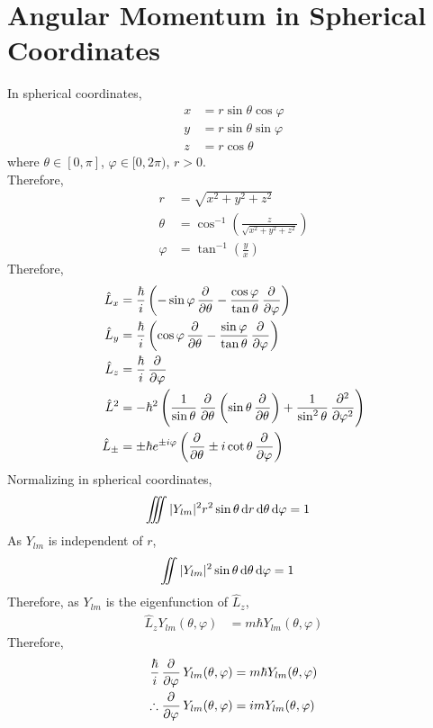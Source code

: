 \documentclass[titlepage, fleqn, a4paper, 12pt, twoside]{article}
\theoremstyle{definition}
\theoremstyle{theorem}
\let\Oldsection\section
\renewcommand{\section}{\FloatBarrier\Oldsection}
\begin{document}
\section{Angular Momentum in Spherical Coordinates}

In spherical coordinates,
\begin{align*}
	x &= r \sin \theta \cos \varphi\\
	y &= r \sin \theta \sin \varphi\\
	z &= r \cos \theta
\end{align*}
where $\theta \in [0,\pi]$, $\varphi \in [0,2 \pi)$, $r > 0$.\\
Therefore,
\begin{align*}
	r &= \sqrt{x^2 + y^2 + z^2}\\
	\theta &= \cos^{-1}\left( \frac{z}{\sqrt{x^2 + y^2 + z^2}} \right)\\
	\varphi &= \tan^{-1}\left( \frac{y}{x} \right)
\end{align*}
Therefore,
\begin{align*}
	\hat{L}_x &= \frac{\hbar}{i} \left( -\sin \varphi \dpd{}{\theta} - \frac{\cos \varphi}{\tan \theta} \dpd{}{\varphi} \right)\\
	\hat{L}_y &= \frac{\hbar}{i} \left( \cos \varphi \dpd{}{\theta} - \frac{\sin \varphi}{\tan \theta} \dpd{}{\varphi} \right)\\
	\hat{L}_z &= \frac{\hbar}{i} \dpd{}{\varphi}\\
	\hat{L}^2 &= -\hbar^2 \left( \frac{1}{\sin \theta} \dpd{}{\theta}\left( \sin \theta \dpd{}{\theta} \right) + \frac{1}{\sin^2 \theta} \dpd[2]{}{\varphi} \right)\\
	\hat{L}_{\pm} &= \pm \hbar e^{\pm i \varphi} \left( \dpd{}{\theta} \pm i \cot \theta \dpd{}{\varphi} \right)
\end{align*}
Normalizing in spherical coordinates,
\begin{align*}
	\iiint |Y_{l m}|^2 r^2 \sin \theta \dif r \dif \theta \dif \varphi &= 1
\end{align*}
As $Y_{l m}$ is independent of $r$,
\begin{align*}
	\iint |Y_{l m}|^2 \sin \theta \dif \theta \dif \varphi &= 1
\end{align*}
Therefore, as $Y_{l m}$ is the eigenfunction of $\hat{L}_z$,
\begin{align*}
	\hat{L}_z Y_{l m}(\theta,\varphi) &= m \hbar Y_{l m}(\theta,\varphi)
\end{align*}
Therefore,
\begin{align*}
	\frac{\hbar}{i} \dpd{}{\varphi} Y_{l m}(\theta,\varphi) &= m \hbar Y_{l m}(\theta,\varphi)\\
	\therefore \dpd{}{\varphi} Y_{l m}(\theta,\varphi) &= i m Y_{l m}(\theta,\varphi)
\end{align*}
\end{document}
